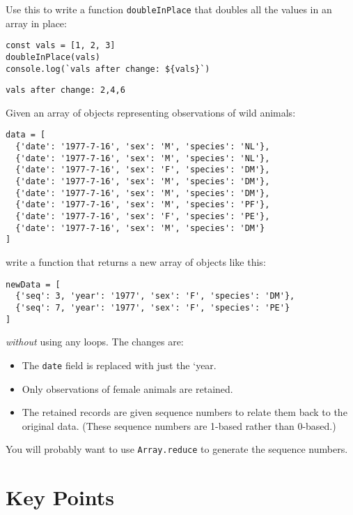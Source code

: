 Use this to write a function \texttt{doubleInPlace}
that doubles all the values in an array in place:

\begin{verbatim}
const vals = [1, 2, 3]
doubleInPlace(vals)
console.log(`vals after change: ${vals}`)
\end{verbatim}

\begin{verbatim}
vals after change: 2,4,6
\end{verbatim}


Given an array of objects representing observations of wild animals:

\begin{verbatim}
data = [
  {'date': '1977-7-16', 'sex': 'M', 'species': 'NL'},
  {'date': '1977-7-16', 'sex': 'M', 'species': 'NL'},
  {'date': '1977-7-16', 'sex': 'F', 'species': 'DM'},
  {'date': '1977-7-16', 'sex': 'M', 'species': 'DM'},
  {'date': '1977-7-16', 'sex': 'M', 'species': 'DM'},
  {'date': '1977-7-16', 'sex': 'M', 'species': 'PF'},
  {'date': '1977-7-16', 'sex': 'F', 'species': 'PE'},
  {'date': '1977-7-16', 'sex': 'M', 'species': 'DM'}
]
\end{verbatim}

\noindent
write a function that returns a new array of objects like this:

\begin{verbatim}
newData = [
  {'seq': 3, 'year': '1977', 'sex': 'F', 'species': 'DM'},
  {'seq': 7, 'year': '1977', 'sex': 'F', 'species': 'PE'}
]
\end{verbatim}

\emph{without} using any loops.
The changes are:

\begin{itemize}
\item
  The \texttt{date} field is replaced with just the `year.
\item
  Only observations of female animals are retained.
\item
  The retained records are given sequence numbers to relate them back to the original data.
  (These sequence numbers are 1-based rather than 0-based.)
\end{itemize}

You will probably want to use \texttt{Array.reduce} to generate the sequence numbers.

\section*{Key Points}


